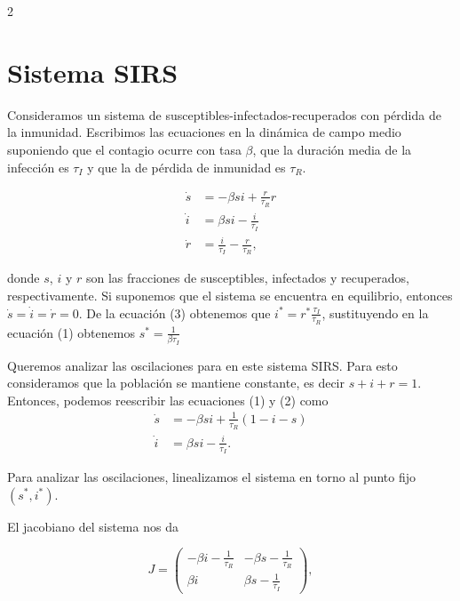 \documentclass[spanish, 12pt, a4paper]{article}
\begin{document}
\maketitle
\thispagestyle{fancy}
\setcounter{page}{1}
\maketitle
\begin{multicols}{2}

\section{Sistema SIRS}

Consideramos un sistema de susceptibles-infectados-recuperados con pérdida de la inmunidad. Escribimos las ecuaciones
en la dinámica de campo medio suponiendo que el contagio ocurre con tasa $\beta$, que la duración media de la infección 
es $\tau_I$ y que la de pérdida de inmunidad es $\tau_R$.

\begin{align}
    \dot{s} &= -\beta s i + \frac{r}{\tau_R} r \\
    \dot{i} &= \beta s i - \frac{i}{\tau_I} \\
    \dot{r} &= \frac{i}{\tau_I} - \frac{r}{\tau_R},
\end{align}

donde $s$, $i$ y $r$ son las fracciones de susceptibles, infectados y recuperados, respectivamente.
Si suponemos que el sistema se encuentra en equilibrio, entonces $\dot{s} = \dot{i} = \dot{r} = 0$.
De la ecuación (3) obtenemos que $i^{*} = r^{*} \frac{\tau_I}{\tau_R}$, sustituyendo en la ecuación (1) obtenemos
$s^{*} = \frac{1}{\beta \tau_I}$

Queremos analizar las oscilaciones para en este sistema SIRS. Para esto consideramos que la población se mantiene constante,
es decir $s + i + r = 1$. Entonces, podemos reescribir las ecuaciones (1) y (2) como
\begin{align*}
    \dot{s} &= -\beta s i + \frac{1}{\tau_R} \left(1 - i - s\right) \\
    \dot{i} &= \beta s i - \frac{i}{\tau_I}.
\end{align*}

Para analizar las oscilaciones, linealizamos el sistema en torno al punto fijo $(s^{*}, i^{*})$.

El jacobiano del sistema nos da

\begin{equation*}
    J = \begin{pmatrix}
        -\beta i - \frac{1}{\tau_R} & -\beta s - \frac{1}{\tau_R} \\
        \beta i & \beta s - \frac{1}{\tau_I}
    \end{pmatrix},
\end{equation*}


\end{multicols}
\end{document}
